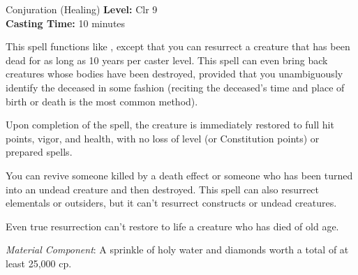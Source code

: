 {Conjuration (Healing)}
{
	\textbf{Level:}
	Clr 9\\
	\textbf{Casting Time:}
	10 minutes\\
}
{
	This spell functions like , except that you can resurrect a creature that has been dead for as long as 10 years per caster level. This spell can even bring back creatures whose bodies have been destroyed, provided that you unambiguously identify the deceased in some fashion (reciting the deceased's time and place of birth or death is the most common method).

	Upon completion of the spell, the creature is immediately restored to full hit points, vigor, and health, with no loss of level (or Constitution points) or prepared spells.

	You can revive someone killed by a death effect or someone who has been turned into an undead creature and then destroyed. This spell can also resurrect elementals or outsiders, but it can't resurrect constructs or undead creatures.

	Even true resurrection can't restore to life a creature who has died of old age.

	\textit{Material Component}:
	A sprinkle of holy water and diamonds worth a total of at least 25,000 cp.

}
